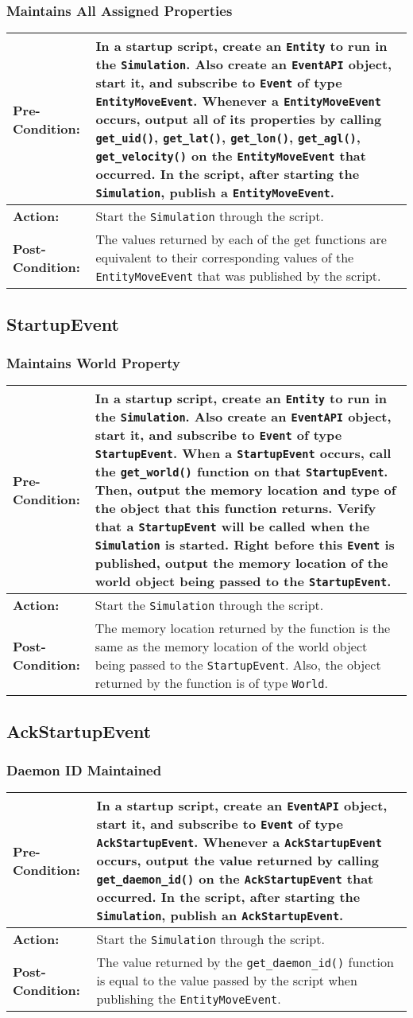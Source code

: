 \documentclass[titlepage]{article}
\newcommand{\testcase}[3]{
    \begin{center}
    \begin{tabular}{| l | p{0.7\textwidth}|}
        \hline
        \rowcolor[gray]{0.8}\textbf{Pre-Condition:} & #1 \\ \hline
        \textbf{Action:} & #2 \\ \hline
        \rowcolor[gray]{0.8}\textbf{Post-Condition:} & #3 \\ \hline
    \end{tabular}
    \end{center}
}
\begin{document}
\subsubsection{Maintains All Assigned Properties}
\testcase{In a startup script, create an \texttt{Entity} to run in the \texttt{Simulation}. Also create an \texttt{EventAPI} object, start it, and subscribe to \texttt{Event} of type \texttt{EntityMoveEvent}. Whenever a \texttt{EntityMoveEvent} occurs, output all of its properties by calling \texttt{get\_uid()}, \texttt{get\_lat()}, \texttt{get\_lon()}, \texttt{get\_agl()}, \texttt{get\_velocity()} on the \texttt{EntityMoveEvent} that occurred. In the script, after starting the \texttt{Simulation}, publish a \texttt{EntityMoveEvent}.}{Start the \texttt{Simulation} through the script.}{The values returned by each of the get functions are equivalent to their corresponding values of the \texttt{EntityMoveEvent} that was published by the script.}

\subsection{StartupEvent}
\subsubsection{Maintains World Property}
\testcase{In a startup script, create an \texttt{Entity} to run in the \texttt{Simulation}. Also create an \texttt{EventAPI} object, start it, and subscribe to \texttt{Event} of type \texttt{StartupEvent}. When a \texttt{StartupEvent} occurs, call the \texttt{get\_world()} function on that \texttt{StartupEvent}. Then, output the memory location and type of the object that this function returns.  Verify that a \texttt{StartupEvent} will be called when the \texttt{Simulation} is started. Right before this \texttt{Event} is published, output the memory location of the world object being passed to the \texttt{StartupEvent}.}{Start the \texttt{Simulation} through the script.}{The memory location returned by the function is the same as the memory location of the world object being passed to the \texttt{StartupEvent}. Also, the object returned by the function is of type \texttt{World}.}

\subsection{AckStartupEvent}
\subsubsection{Daemon ID Maintained}
\testcase{In a startup script, create an \texttt{EventAPI} object, start it, and subscribe to \texttt{Event} of type \texttt{AckStartupEvent}. Whenever a \texttt{AckStartupEvent} occurs, output the value returned by calling \texttt{get\_daemon\_id()} on the \texttt{AckStartupEvent} that occurred. In the script, after starting the \texttt{Simulation}, publish an \texttt{AckStartupEvent}.}{Start the \texttt{Simulation} through the script.}{The value returned by the \texttt{get\_daemon\_id()} function is equal to the value passed by the script when publishing the \texttt{EntityMoveEvent}.}
\end{document}
